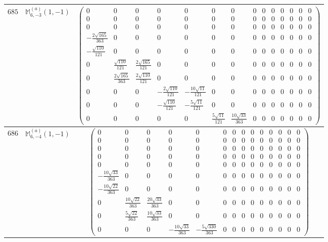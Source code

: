 \documentclass[fleqn,8pt,landscape]{jsarticle}
\begin{document}
\begin{center}
\begin{longtable}{ccc}
$ 685 $ & $ \mathbb{M}_{6,-3}^{(a)}(1,-1) $ & $ \begin{pmatrix} 0 & 0 & 0 & 0 & 0 & 0 & 0 & 0 & 0 & 0 & 0 & 0 & 0 & 0 \\ 0 & 0 & 0 & 0 & 0 & 0 & 0 & 0 & 0 & 0 & 0 & 0 & 0 & 0 \\ 0 & 0 & 0 & 0 & 0 & 0 & 0 & 0 & 0 & 0 & 0 & 0 & 0 & 0 \\ - \frac{2 \sqrt{165}}{363} & 0 & 0 & 0 & 0 & 0 & 0 & 0 & 0 & 0 & 0 & 0 & 0 & 0 \\ - \frac{\sqrt{110}}{121} & 0 & 0 & 0 & 0 & 0 & 0 & 0 & 0 & 0 & 0 & 0 & 0 & 0 \\ 0 & \frac{\sqrt{110}}{121} & \frac{2 \sqrt{165}}{121} & 0 & 0 & 0 & 0 & 0 & 0 & 0 & 0 & 0 & 0 & 0 \\ 0 & \frac{2 \sqrt{165}}{363} & \frac{2 \sqrt{110}}{121} & 0 & 0 & 0 & 0 & 0 & 0 & 0 & 0 & 0 & 0 & 0 \\ 0 & 0 & 0 & - \frac{2 \sqrt{110}}{121} & - \frac{10 \sqrt{11}}{121} & 0 & 0 & 0 & 0 & 0 & 0 & 0 & 0 & 0 \\ 0 & 0 & 0 & - \frac{\sqrt{110}}{121} & - \frac{5 \sqrt{11}}{121} & 0 & 0 & 0 & 0 & 0 & 0 & 0 & 0 & 0 \\ 0 & 0 & 0 & 0 & 0 & \frac{5 \sqrt{11}}{121} & \frac{10 \sqrt{33}}{363} & 0 & 0 & 0 & 0 & 0 & 0 & 0 \end{pmatrix} $ \\ \hline
$ 686 $ & $ \mathbb{M}_{6,-4}^{(a)}(1,-1) $ & $ \begin{pmatrix} 0 & 0 & 0 & 0 & 0 & 0 & 0 & 0 & 0 & 0 & 0 & 0 & 0 & 0 \\ 0 & 0 & 0 & 0 & 0 & 0 & 0 & 0 & 0 & 0 & 0 & 0 & 0 & 0 \\ 0 & 0 & 0 & 0 & 0 & 0 & 0 & 0 & 0 & 0 & 0 & 0 & 0 & 0 \\ 0 & 0 & 0 & 0 & 0 & 0 & 0 & 0 & 0 & 0 & 0 & 0 & 0 & 0 \\ 0 & 0 & 0 & 0 & 0 & 0 & 0 & 0 & 0 & 0 & 0 & 0 & 0 & 0 \\ - \frac{10 \sqrt{33}}{363} & 0 & 0 & 0 & 0 & 0 & 0 & 0 & 0 & 0 & 0 & 0 & 0 & 0 \\ - \frac{10 \sqrt{22}}{363} & 0 & 0 & 0 & 0 & 0 & 0 & 0 & 0 & 0 & 0 & 0 & 0 & 0 \\ 0 & \frac{10 \sqrt{22}}{363} & \frac{20 \sqrt{33}}{363} & 0 & 0 & 0 & 0 & 0 & 0 & 0 & 0 & 0 & 0 & 0 \\ 0 & \frac{5 \sqrt{22}}{363} & \frac{10 \sqrt{33}}{363} & 0 & 0 & 0 & 0 & 0 & 0 & 0 & 0 & 0 & 0 & 0 \\ 0 & 0 & 0 & - \frac{10 \sqrt{33}}{363} & - \frac{5 \sqrt{330}}{363} & 0 & 0 & 0 & 0 & 0 & 0 & 0 & 0 & 0 \end{pmatrix} $ \\ \hline

\end{longtable}
\end{center}
\end{document}
